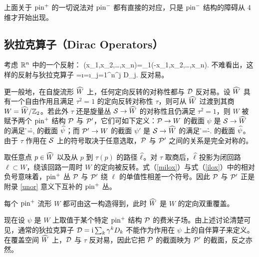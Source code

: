 
上面关于 $\pin^+$ 的一切说法对 $\pin^-$ 都有直接的对应，只是 $\pin^-$ 结构的障碍从 4 维才开始出现。

\subsection{狄拉克算子（Dirac Operators）}\label{do}

考虑 $\R^n$ 中的一个反射：
\be\label{porz}\sR\psi(x_1,x_2,\dots,x_n)=\g_1\psi(-x_1,x_2,\dots,x_n).\ee
不难看出，这样的反射与狄拉克算子
\be\label{orzo} \D=\i{}=\i\sum_{j=1}^n\g^j D_j. \ee
反对易。


更一般地，在自旋流形 $\h W$ 上，任何定向反转的对称性都与 $\D$ 反对易。设 $\h W$ 具有一个自由作用且满足 $\tau^2=1$ 的定向反转对称性 $\tau$，则可从 $\h W$ 过渡到其商 $W=\h W/\Z_2$。若此外 $\tau$ 还是旋量丛 $\S\to \h W$ 的对称性且仍满足 $\tau^2=1$，则 $W$ 被赋予两个 $\pin^+$ 结构 $\P$ 与 $\P'$，它们可如下定义：$\P\to W$ 的截面 $\psi$ 是 $\S\to \h W$ 的满足
\be\label{milox} \tau\h\psi=\h\psi, \ee
的截面 $\h\psi$；而 $\P'\to W$ 的截面 $\psi'$ 是 $\S\to \h W$ 的满足
\be\label{ilox}\tau\h\psi=-\h\psi.\ee
的截面 $\h\psi$。由于 $\tau$ 作用在 $\S$ 上的符号取决于任意选取，$\P$ 与 $\P'$ 之间的关系是完全对称的。

取任意点 $p\in \h W$ 以及从 $p$ 到 $\tau(p)$ 的路径 $\h\ell$。对 $\tau$ 取商后，$\h\ell$ 投影为闭回路 $\ell\subset W$，绕该回路一周时 $W$ 的定向被反转。式（\ref{milox}）与式（\ref{ilox}）中的相对负号意味着，$\pin^+$ 丛 $\P$ 与 $\P'$ 绕 $\ell$ 的单值性相差一个符号。因此 $\P$ 与 $\P'$ 正是附录 \ref{unor} 意义下互补的 $\pin^+$ 丛。

每个 $\pin^+$ 流形 $W$ 都可由这一构造得到，此时 $\h W$ 是 $W$ 的定向双重覆盖。

现在设 $\psi$ 是 $W$ 上取值于某个特定 $\pin^+$ 结构 $\P$ 的费米子场。由上述讨论清楚可见，通常的狄拉克算子 $\D=\i\sum_k\g^k D_k$ 不能作为作用在 $\psi$ 上的自伴算子来定义。在覆盖空间 $\h W$ 上，$\D$ 与 $\tau$ 反对易，因此它把 $\P$ 的截面映为 $\P'$ 的截面，反之亦然。

